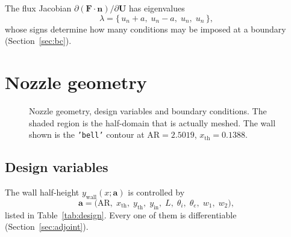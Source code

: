 \documentclass[11pt,a4paper]{article}
\newcommand{\vect}[1]{\boldsymbol{#1}}
\newcommand{\Uvec}{\vect{U}}
\newcommand{\Fvec}{\vect{F}}
\newcommand{\nvec}{\vect{n}}
\newcommand{\avec}{\vect{a}}
\newcommand{\code}[1]{\texttt{#1}}
\begin{document}
The flux Jacobian $\partial(\Fvec\!\cdot\!\nvec)/\partial\Uvec$ has eigenvalues
\begin{equation}
  \lambda = \{\,u_n + a,\; u_n - a,\; u_n,\; u_n\,\},
  \label{eq:eigs}
\end{equation}
whose signs determine how many conditions may be imposed at a boundary
(Section~\ref{sec:bc}).

\section{Nozzle geometry}
\label{sec:geometry}

\begin{figure}[H]
  \centering
  \resizebox{\textwidth}{!}{}
  \caption{Nozzle geometry, design variables and boundary conditions.  The
    shaded region is the half-domain that is actually meshed.  The wall shown is
    the \code{'bell'} contour at $\mathrm{AR} = 2.5019$, $x_{\mathrm{th}} = 0.1388$.}
  \label{fig:geometry}
\end{figure}

\subsection{Design variables}

The wall half-height $y_{\mathrm{wall}}(x; \avec)$ is controlled by
\begin{equation}
  \avec = \bigl(\mathrm{AR},\; x_{\mathrm{th}},\; y_{\mathrm{th}},\;
                y_{\mathrm{in}},\; L,\; \theta_i,\; \theta_e,\; w_1,\; w_2\bigr),
\end{equation}
listed in Table~\ref{tab:design}.  Every one of them is differentiable
(Section~\ref{sec:adjoint}).
\end{document}
